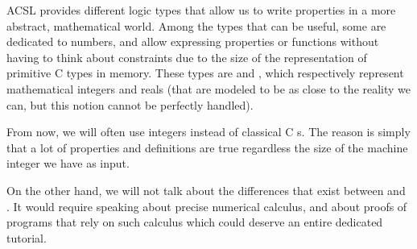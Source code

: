 ACSL provides different logic types that allow us to write properties in a more
abstract, mathematical world. Among the types that can be useful, some are
dedicated to numbers, and allow expressing properties or functions without
having to think about constraints due to the size of
the representation of primitive C types in memory. These types are
 and , which respectively represent
mathematical integers and reals (that are modeled to be as close to the
reality we can, but this notion cannot be perfectly handled).

From now, we will often use integers instead of classical C
s. The reason is simply that a lot of properties and
definitions are true regardless the size of the machine integer we have
as input.

On the other hand, we will not talk about the differences that exist
between  and . It would require
speaking about precise numerical calculus, and about proofs of programs
that rely on such calculus which could deserve an entire dedicated
tutorial.
